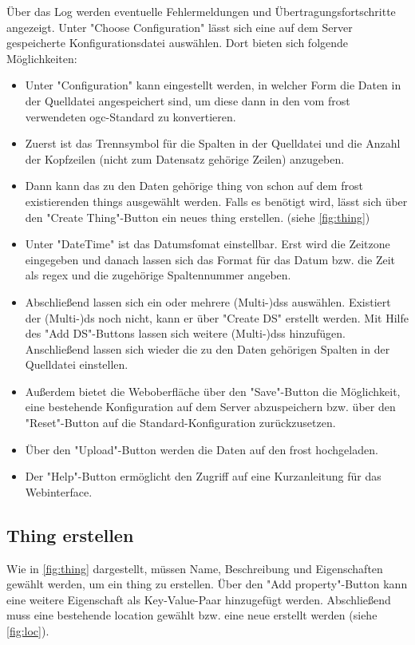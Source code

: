 \documentclass[a4paper, 12 pt]{article}
\begin{document}
Über das Log werden eventuelle Fehlermeldungen und Übertragungsfortschritte angezeigt. Unter \string"Choose Configuration\string" lässt sich eine auf dem Server gespeicherte Konfigurationsdatei auswählen. Dort bieten sich folgende Möglichkeiten:
\begin{itemize}
\item Unter "{Configuration}" kann eingestellt werden, in welcher Form die Daten in der Quelldatei angespeichert sind, um diese dann in den vom \gls{frost} verwendeten \gls{ogc}-Standard zu konvertieren.
\item Zuerst ist das Trennsymbol für die Spalten in der Quelldatei und die Anzahl der Kopfzeilen (nicht zum Datensatz gehörige Zeilen) anzugeben. 
\item Dann kann das zu den Daten gehörige \gls{thing} von schon auf dem \gls{frost} existierenden \glspl{thing} ausgewählt werden. Falls es benötigt wird, lässt sich über den "{Create Thing}"{-Button} ein neues \gls{thing} erstellen. (siehe \cref{fig:thing})
\item Unter "{DateTime}"{ ist} das Datumsfomat einstellbar. Erst wird die Zeitzone eingegeben und danach lassen sich das Format für das Datum bzw. die Zeit als \gls{regex} und die zugehörige Spaltennummer angeben.
\item Abschließend lassen sich ein oder mehrere (Multi-)\glspl{ds} auswählen. Existiert der (Multi-)\gls{ds} noch nicht, kann er über "{Create DS}"{ erstellt} werden. Mit Hilfe des "{Add DS}"{-Buttons} lassen sich weitere (Multi-)\glspl{ds} hinzufügen. Anschließend lassen sich wieder die zu den Daten gehörigen Spalten in der Quelldatei einstellen.
\item Außerdem bietet die Weboberfläche über den "{Save}"{-Button} die Möglichkeit, eine bestehende Konfiguration auf dem Server abzuspeichern bzw. über den "{Reset}"{-Button} auf die Standard-Konfiguration zurückzusetzen.
\item Über den "{Upload}"{-Button} werden die Daten auf den \gls{frost} hochgeladen.
\item Der "{Help}"{-Button} ermöglicht den Zugriff auf eine Kurzanleitung für das Webinterface.
\end{itemize}

\subsection{Thing erstellen}
Wie in \cref{fig:thing} dargestellt, müssen Name, Beschreibung und Eigenschaften gewählt werden, um ein \gls{thing} zu erstellen. Über den "{Add property}"{-Button} kann eine weitere Eigenschaft als Key-Value-Paar hinzugefügt werden. Abschließend muss eine bestehende \gls{location} gewählt bzw. eine neue erstellt werden (siehe \cref{fig:loc}).
\end{document}
